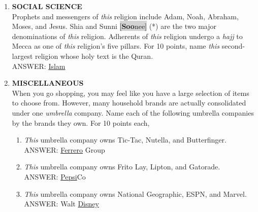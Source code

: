\documentclass{report}
\newcommand*{\backtrack}{\setcounter{enumi}{\numexpr\theenumi-1\relax}}
\begin{document}
\begin{enumerate}
    \item \textbf{SOCIAL SCIENCE} \\ Prophets and messengers of \textit{this} religion include Adam, Noah, Abraham, Moses, and Jesus. Shia and Sunni \colorbox{lightGray}{[\textbf{Soo}\textperiodcentered nee]} (*) are the two major denominations of \textit{this} religion. Adherents of \textit{this} religion undergo a \textit{hajj} to Mecca as one of \textit{this} religion's five pillars. For 10 points, name \textit{this} second-largest religion whose holy text is the Quran. \\ ANSWER: \underline{Islam} \backtrack
    \item \textbf{MISCELLANEOUS} \\ When you go shopping, you may feel like you have a large selection of items to choose from. However, many household brands are actually consolidated under one \textit{umbrella} company. Name each of the following umbrella companies by the brands they own. For 10 points each,
    \begin{enumerate}[label=\Alph*]
        \item \textit{This} umbrella company owns Tic-Tac, Nutella, and Butterfinger. \\ ANSWER: \underline{Ferrero} Group
        \item \textit{This} umbrella company owns Frito Lay, Lipton, and Gatorade. \\ ANSWER: \underline{Pepsi}Co
        \item \textit{This} umbrella company owns National Geographic, ESPN, and Marvel. \\ ANSWER: Walt \underline{Disney}
    \end{enumerate}


\end{enumerate}
\end{document}
